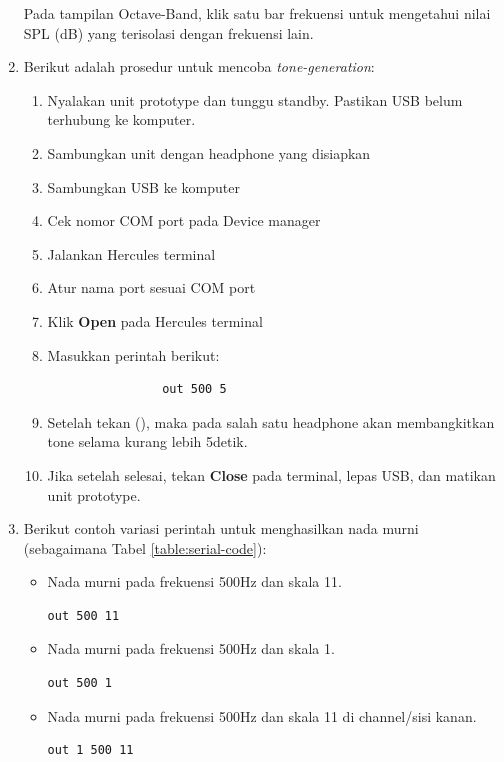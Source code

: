 \documentclass{article}
\begin{document}
\begin{enumerate}
		Pada tampilan Octave-Band, klik satu bar frekuensi untuk mengetahui nilai SPL (dB)
		yang terisolasi dengan frekuensi lain.
	

		\item Berikut adalah prosedur untuk mencoba \textit{tone-generation}:
		\begin{enumerate}
			\item Nyalakan unit prototype dan tunggu standby.
			Pastikan USB belum terhubung ke komputer.
			\item Sambungkan unit dengan headphone yang disiapkan
			\item Sambungkan USB ke komputer
			\item Cek nomor COM port pada Device manager
			\item Jalankan Hercules terminal
			\item Atur nama port sesuai COM port
			\item Klik \textbf{Open} pada Hercules terminal
			\item Masukkan perintah berikut:
			\begin{verbatim}
				out 500 5
			\end{verbatim}
			\item Setelah tekan (\keys{\return}), maka pada salah satu headphone
			akan membangkitkan tone selama kurang lebih 5detik.
			\item Jika setelah selesai, tekan \textbf{Close} pada terminal,
			lepas USB, dan matikan unit prototype.
			
		\end{enumerate}
		
		\item Berikut contoh variasi perintah untuk menghasilkan nada murni (sebagaimana Tabel \ref{table:serial-code}):
		
		\begin{itemize}
			\item Nada murni pada frekuensi 500Hz dan skala 11.
			\begin{verbatim}
out 500 11
			\end{verbatim}
			
			\item Nada murni pada frekuensi 500Hz dan skala 1.
			\begin{verbatim}
out 500 1
			\end{verbatim}
			
			\item Nada murni pada frekuensi 500Hz dan skala 11 di channel/sisi kanan.
			\begin{verbatim}
out 1 500 11
			\end{verbatim}
			

\end{itemize}
\end{enumerate}
\end{document}
